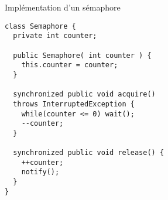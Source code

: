
\begingroup

\begin{frame}[fragile]{Implémentation d'un sémaphore}
 
  \begin{lstlisting}
class Semaphore {
  private int counter;
  
  public Semaphore( int counter ) {
    this.counter = counter;
  }
 
  synchronized public void acquire()
  throws InterruptedException {
    while(counter <= 0) wait();
    --counter;
  }
  
  synchronized public void release() {
    ++counter;
    notify();
  }
}
\end{lstlisting}
\end{frame}

\endgroup
\endinput
